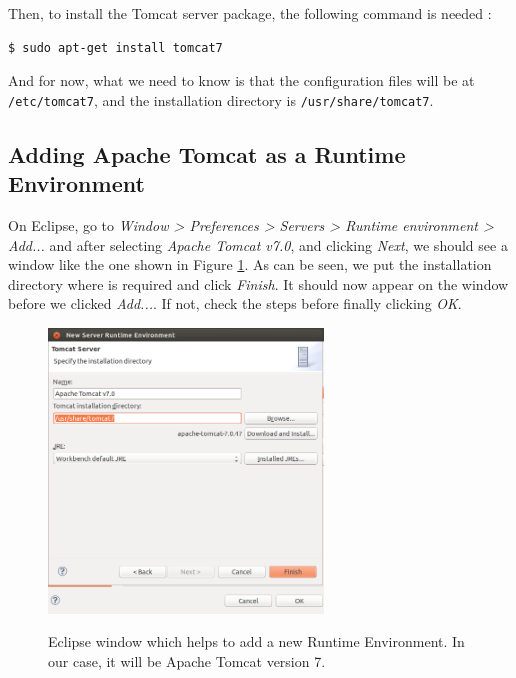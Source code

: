 \documentclass[a4paper,11pt]{book}
\begin{document}
Then, to install the Tomcat server package, the following command is needed \cite{tomcatdocu:site}:

\begin{verbatim}
$ sudo apt-get install tomcat7
\end{verbatim}

And for now, what we need to know is that the configuration files will be at \texttt{/etc/tomcat7}, and the installation directory is \texttt{/usr/share/tomcat7}.

\subsection{Adding Apache Tomcat as a Runtime Environment}
\label{subsec:apacheSRE}

On Eclipse, go to \textit{Window > Preferences > Servers > Runtime environment > Add...} and after selecting \textit{Apache Tomcat v7.0}, and clicking \textit{Next}, we should see a window like the one shown in Figure \ref{fig:addingSRE}. As can be seen, we put the installation directory where is required and click \textit{Finish}. It should now appear on the window before we clicked \textit{Add...}. If not, check the steps before finally clicking \textit{OK}.

\begin{figure}
  \begin{center}
    \includegraphics[width=0.65\textwidth]{./Figures/addingSRE.png}
    \label{fig:addingSRE}
    \caption{Eclipse window which helps to add a new Runtime Environment. In our case, it will be Apache Tomcat version 7.}
  \end{center}
\end{figure}
\end{document}
